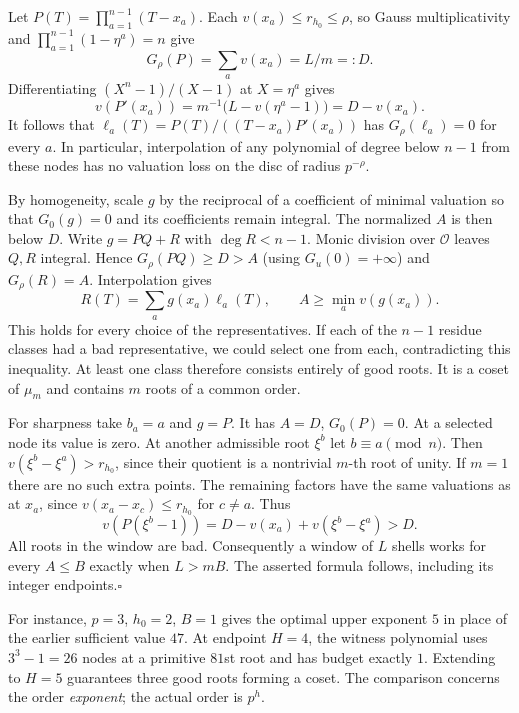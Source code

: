 Let $P(T)=\prod_{a=1}^{n-1}(T-x_a)$. Each $v(x_a)\le r_{h_0}\le\rho$, so Gauss multiplicativity and $\prod_{a=1}^{n-1}(1-\eta^a)=n$ give
\[
          G_\rho(P)=\sum_a v(x_a)=L/m=:D .
\]
Differentiating $(X^n-1)/(X-1)$ at $X=\eta^a$ gives
\[
          v(P'(x_a))=m^{-1}\bigl(L-v(\eta^a-1)\bigr)
                       =D-v(x_a).
\]
It follows that $\ell_a(T)=P(T)/((T-x_a)P'(x_a))$ has $G_\rho(\ell_a)=0$ for every $a$. In particular, interpolation of any polynomial of degree below $n-1$ from these nodes has no valuation loss on the disc of radius $p^{-\rho}$.

By homogeneity, scale $g$ by the reciprocal of a coefficient of minimal valuation so that $G_0(g)=0$ and its coefficients remain integral. The normalized $A$ is then below $D$. Write $g=P Q+R$ with $\deg R<n-1$. Monic division over $\mathcal O$ leaves $Q,R$ integral. Hence $G_\rho(PQ)\ge D>A$ (using $G_u(0)=+\infty$) and $G_\rho(R)=A$. Interpolation gives
\[
               R(T)=\sum_a g(x_a)\ell_a(T),\qquad
               A\ge\min_a v(g(x_a)).
\]
This holds for every choice of the representatives. If each of the $n-1$ residue classes had a bad representative, we could select one from each, contradicting this inequality. At least one class therefore consists entirely of good roots. It is a coset of $\mu_m$ and contains $m$ roots of a common order.

For sharpness take $b_a=a$ and $g=P$. It has $A=D$, $G_0(P)=0$. At a selected node its value is zero. At another admissible root $\xi^b$ let $b\equiv a\pmod n$. Then $v(\xi^b-\xi^a)> r_{h_0}$, since their quotient is a nontrivial $m$-th root of unity. If $m=1$ there are no such extra points. The remaining factors have the same valuations as at $x_a$, since $v(x_a-x_c)\le r_{h_0}$ for $c\ne a$. Thus
\[
        v(P(\xi^b-1))=D-v(x_a)+v(\xi^b-\xi^a)>D .
\]
All roots in the window are bad. Consequently a window of $L$ shells works for every $A\le B$ exactly when $L>mB$. The asserted formula follows, including its integer endpoints.\hfill$\square$

\medskip
For instance, $p=3$, $h_0=2$, $B=1$ gives the optimal upper exponent $5$ in place of the earlier sufficient value $47$. At endpoint $H=4$, the witness polynomial uses $3^3-1=26$ nodes at a primitive $81$st root and has budget exactly $1$. Extending to $H=5$ guarantees three good roots forming a coset. The comparison concerns the order \emph{exponent}; the actual order is $p^h$.

